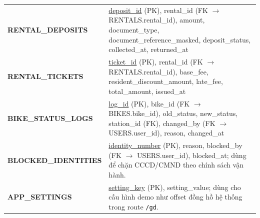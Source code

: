 \begin{longtable}{P{0.30\textwidth}P{0.60\textwidth}}
\textbf{RENTAL\_DEPOSITS} & \underline{deposit\_id} (PK), rental\_id (FK $\rightarrow$ RENTALS.rental\_id), amount, document\_type, document\_reference\_masked, deposit\_status, collected\_at, returned\_at \\
\textbf{RENTAL\_TICKETS} & \underline{ticket\_id} (PK), rental\_id (FK $\rightarrow$ RENTALS.rental\_id), base\_fee, resident\_discount\_amount, late\_fee, total\_amount, issued\_at \\
\textbf{BIKE\_STATUS\_LOGS} & \underline{log\_id} (PK), bike\_id (FK $\rightarrow$ BIKES.bike\_id), old\_status, new\_status, station\_id (FK), changed\_by (FK $\rightarrow$ USERS.user\_id), reason, changed\_at \\
\textbf{BLOCKED\_IDENTITIES} & \underline{identity\_number} (PK), reason, blocked\_by (FK $\rightarrow$ USERS.user\_id), blocked\_at; dùng để chặn CCCD/CMND theo chính sách vận hành. \\
\textbf{APP\_SETTINGS} & \underline{setting\_key} (PK), setting\_value; dùng cho cấu hình demo như offset đồng hồ hệ thống trong route \texttt{/gd}. \\
\bottomrule
\end{longtable}
\normalsize

